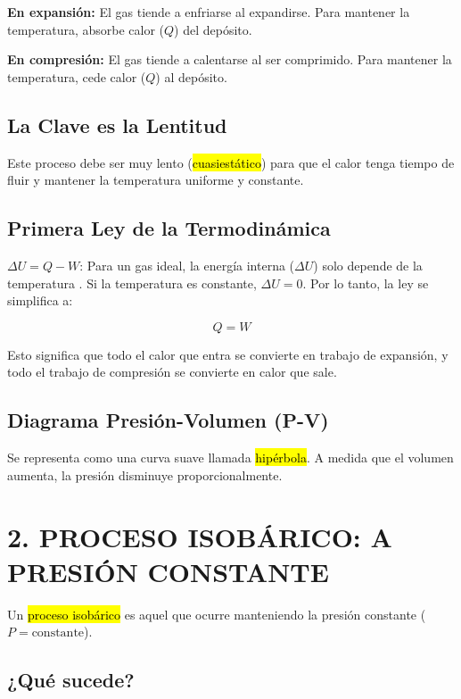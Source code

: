 \documentclass{article}
\begin{document}
\textbf{En expansión:} El gas tiende a enfriarse al expandirse. Para mantener la temperatura, absorbe calor ($Q$) del depósito.

\textbf{En compresión:} El gas tiende a calentarse al ser comprimido. Para mantener la temperatura, cede calor ($Q$) al depósito.

\subsection*{La Clave es la Lentitud}

Este proceso debe ser muy lento (\hl{cuasiestático}) para que el calor tenga tiempo de fluir y mantener la temperatura uniforme y constante.

\subsection*{Primera Ley de la Termodinámica}

$\Delta U = Q - W$: Para un gas ideal, la energía interna ($\Delta U$) solo depende de la temperatura \parencite{wark2001}. Si la temperatura es constante, $\Delta U = 0$. Por lo tanto, la ley se simplifica a:

$$Q = W$$

Esto significa que todo el calor que entra se convierte en trabajo de expansión, y todo el trabajo de compresión se convierte en calor que sale.

\subsection*{Diagrama Presión-Volumen (P-V)}

Se representa como una curva suave llamada \hl{hipérbola}. A medida que el volumen aumenta, la presión disminuye proporcionalmente.

\vspace{5mm}

\section*{2. PROCESO ISOBÁRICO: A PRESIÓN CONSTANTE}

Un \hl{proceso isobárico} es aquel que ocurre manteniendo la presión constante ($P = \text{constante}$).

\subsection*{¿Qué sucede?}
\end{document}
